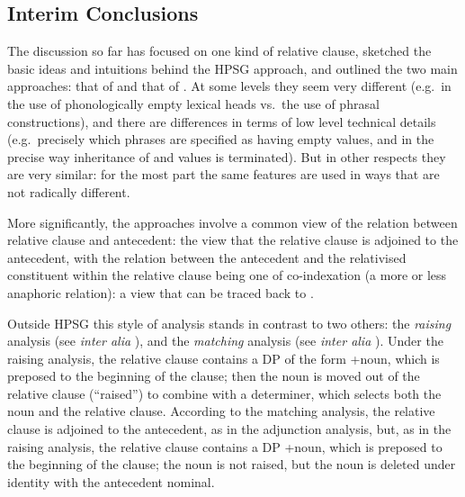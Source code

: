 \documentclass[output=paper
 	        ,biblatex
                ,babelshorthands
                ,newtxmath
                ,draftmode
                ,colorlinks, citecolor=brown
]{langscibook}
\begin{document}
\subsection{Interim Conclusions}
\label{sec:rc-interim-conclusions}
The discussion so far has focused on one kind of relative clause, sketched the basic ideas
and intuitions behind the HPSG approach, and outlined the two main approaches:
that of \citet{Pollard:Sag:94} and that of \citet{Sag:97}. At some levels they seem very
different (e.g.\ in the use of phonologically empty lexical heads vs.\ the use of phrasal constructions), and there
are differences in terms of low level technical details (e.g.\ precisely which
phrases are specified as having empty  values, and in the precise way
inheritance of  and  values is terminated). But in other respects they are
very similar: for the most part the same features are used in ways that are not radically
different.

More significantly, the approaches involve a common view of the relation between relative
clause and antecedent: the view that the relative clause is adjoined to the antecedent,
with the relation between the antecedent and the relativised constituent within the
relative clause being one of co-indexation (a more or less anaphoric relation): a view
that can be traced back to .

Outside HPSG this style of analysis stands in contrast to two others: the \emph{raising}
analysis (see \emph{inter alia} \textcites{Schachter73a-u}{Vergnaud74a-u}[Section~8.2--8.4]{Kayne94a-u}), and the
\emph{matching} analysis (see \emph{inter alia} \cites[137--138]{Chomsky65a}{Lees61Constituent}[Section~2.4]{Sauerland98MeaninChain}). Under the raising analysis, the relative clause contains a DP of the
form +noun, which is preposed to the beginning of the clause; then the noun is
moved out of the relative clause (``raised'') to combine with a determiner, which selects
both the noun and the relative clause. According to the matching analysis, the relative clause is adjoined to the antecedent, as in the adjunction analysis, but, as in the
raising analysis, the relative clause contains a
DP +noun, which is preposed to the beginning of the clause; the noun is not
raised, but the noun is deleted under identity with the antecedent nominal.
\end{document}
